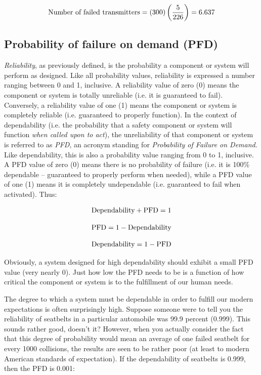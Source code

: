 $$\hbox{Number of failed transmitters} = (300) \left({5 \over 226} \right) = 6.637$$







\filbreak
\subsection{Probability of failure on demand (PFD)}

\textit{Reliability}, as previously defined, is the probability a component or system will perform as designed.  Like all probability values, reliability is expressed a number ranging between 0 and 1, inclusive.  A reliability value of zero (0) means the component or system is totally unreliable (i.e. it is guaranteed to fail).  Conversely, a reliability value of one (1) means the component or system is completely reliable (i.e. guaranteed to properly function).  In the context of dependability (i.e. the probability that a safety component or system will function \textit{when called upon to act}), the unreliability of that component or system is referred to as \textit{PFD}, an acronym standing for \textit{Probability of Failure on Demand}.  Like dependability, this is also a probability value ranging from 0 to 1, inclusive.  A PFD value of zero (0) means there is no probability of failure (i.e. it is 100\% dependable -- guaranteed to properly perform when needed), while a PFD value of one (1) means it is completely undependable (i.e. guaranteed to fail when activated).  Thus:    

$$\hbox{Dependability} + \hbox{PFD} = 1$$

$$\hbox{PFD} = 1 - \hbox{Dependability}$$

$$\hbox{Dependability} = 1 - \hbox{PFD}$$

Obviously, a system designed for high dependability should exhibit a small PFD value (very nearly 0).  Just how low the PFD needs to be is a function of how critical the component or system is to the fulfillment of our human needs.

The degree to which a system must be dependable in order to fulfill our modern expectations is often surprisingly high.  Suppose someone were to tell you the reliability of seatbelts in a particular automobile was 99.9 percent (0.999).  This sounds rather good, doesn't it?  However, when you actually consider the fact that this degree of probability would mean an average of one failed seatbelt for every 1000 collisions, the results are seen to be rather poor (at least to modern American standards of expectation).  If the dependability of seatbelts is 0.999, then the PFD is 0.001:

